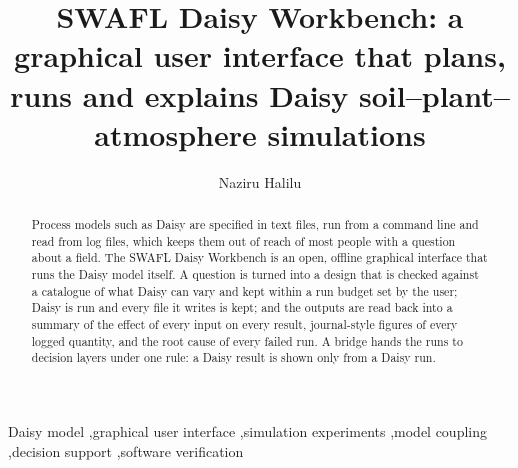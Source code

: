 \documentclass[preprint,12pt]{elsarticle}
\begin{document}
\begin{frontmatter}
\title{SWAFL Daisy Workbench: a graphical user interface that plans, runs and explains Daisy soil--plant--atmosphere simulations}

\author[aua,upna]{Naziru Halilu}

\begin{abstract}
Process models such as Daisy are specified in text files, run from a command line and read from log files, which keeps them out of reach of most people with a question about a field. The SWAFL Daisy Workbench is an open, offline graphical interface that runs the Daisy model itself. A question is turned into a design that is checked against a catalogue of what Daisy can vary and kept within a run budget set by the user; Daisy is run and every file it writes is kept; and the outputs are read back into a summary of the effect of every input on every result, journal-style figures of every logged quantity, and the root cause of every failed run. A bridge hands the runs to decision layers under one rule: a Daisy result is shown only from a Daisy run.
\end{abstract}

\begin{keyword}
Daisy model \sep graphical user interface \sep simulation experiments \sep model coupling \sep decision support \sep software verification
\end{keyword}
\end{frontmatter}
\end{document}
